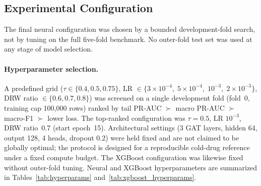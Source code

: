 \documentclass[11pt,a4paper,twocolumn]{article}
\begin{document}
\subsection{Experimental Configuration}
The final neural configuration was chosen by a bounded development-fold search,
not by tuning on the full five-fold benchmark.
No outer-fold test set was used at any stage of model selection.

\paragraph{Hyperparameter selection.}
A predefined grid ($\tau \!\in\! \{0.4, 0.5, 0.75\}$,
LR $\!\in\! \{3\!\times\!10^{-4}\!,\;5\!\times\!10^{-4}\!,\;10^{-3}\!,\;2\!\times\!10^{-3}\}$,
DRW ratio $\!\in\! \{0.6, 0.7, 0.8\}$) was screened on a single development
fold (fold~0, training cap 100{,}000 rows) ranked by
tail PR-AUC $\succ$ macro PR-AUC $\succ$ macro-F1 $\succ$ lower loss.
The top-ranked configuration was $\tau\!=\!0.5$, LR $10^{-3}$, DRW ratio~0.7
(start epoch~15).
Architectural settings (3 GAT layers, hidden 64, output 128, 4 heads,
dropout 0.2) were held fixed and are not claimed to be globally optimal;
the protocol is designed for a reproducible cold-drug reference under a
fixed compute budget.
The XGBoost configuration was likewise fixed without outer-fold tuning.
Neural and XGBoost hyperparameters are summarized in
Tables~\ref{tab:hyperparams} and~\ref{tab:xgboost_hyperparams}.
\end{document}
